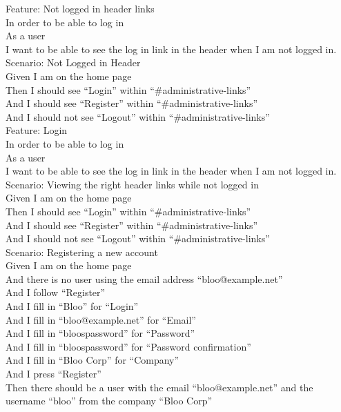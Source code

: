 \documentclass[12pt]{article}
\begin{document}
\begin{hangparas}{0.25in}{1}
Feature: Not logged in header links \\
In order to be able to log in \\
As a user \\
I want to be able to see the log in link in the header when I am not logged in. \\

Scenario: Not Logged in Header  \\
Given I am on the home page \\
Then I should see ``Login'' within ``\#administrative-links'' \\
And I should see ``Register'' within ``\#administrative-links'' \\
And I should not see ``Logout'' within ``\#administrative-links'' \\

Feature: Login \\
  In order to be able to log in \\
  As a user \\
  I want to be able to see the log in link in the header when I am not logged in. \\

Scenario: Viewing the right header links while not logged in  \\
  Given I am on the home page \\
  Then I should see ``Login'' within ``\#administrative-links'' \\
  And I should see ``Register'' within ``\#administrative-links'' \\
  And I should not see ``Logout'' within ``\#administrative-links'' \\


Scenario: Registering a new account \\
Given I am on the home page \\
And there is no user using the email address ``bloo@example.net'' \\
And I follow ``Register'' \\
And I fill in ``Bloo'' for ``Login'' \\
And I fill in ``bloo@example.net'' for ``Email'' \\
And I fill in ``bloospassword'' for ``Password'' \\
And I fill in ``bloospassword'' for ``Password confirmation'' \\
And I fill in ``Bloo Corp'' for ``Company'' \\
And I press ``Register'' \\
Then there should be a user with the email ``bloo@example.net'' and the username ``bloo'' from the company ``Bloo Corp'' \\


\end{hangparas}
\end{document}
